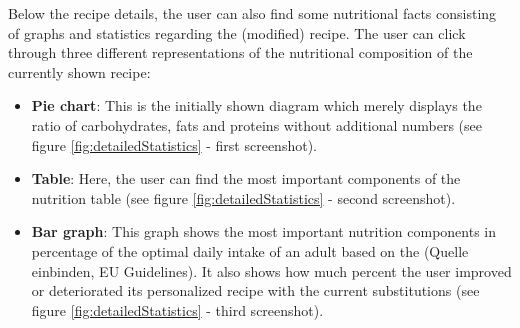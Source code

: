 Below the recipe details, the user can also find some nutritional facts consisting of graphs and statistics regarding the (modified) recipe. The user can click through three different representations of the nutritional composition of the currently shown recipe:
\begin{itemize}
\item \textbf{Pie chart}: This is the initially shown diagram which merely displays the ratio of carbohydrates, fats and proteins without additional numbers (see figure \ref{fig:detailedStatistics} - first screenshot).
\item \textbf{Table}: Here, the user can find the most important components of the nutrition table (see figure \ref{fig:detailedStatistics} - second screenshot).
\item \textbf{Bar graph}: This graph shows the most important nutrition components in percentage of the optimal daily intake of an adult based on the (Quelle einbinden, EU Guidelines). It also shows how much percent the user improved or deteriorated its personalized recipe with the current substitutions (see figure \ref{fig:detailedStatistics} - third screenshot).
\end{itemize}

